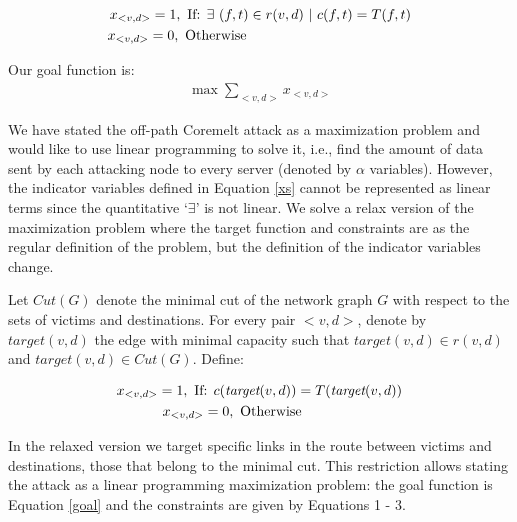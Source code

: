 \documentclass[conference]{IEEEtran}
\begin{document}
\begin{eqnarray} \label{xs}
x_{<v,d>} = 1, \text{ If: } \exists\text{ }(f,t)\in r(v,d)\text{ }|\text{ }c(f,t) = T(f,t) \nonumber\\
x_{<v,d>} = 0, \text{ Otherwise\hspace{118pt}}
\end{eqnarray}

Our goal function is:
\begin{eqnarray} \label{goal}
\max \sum_{<v,d>} x_{<v,d>}
\end{eqnarray}

We have stated the off-path Coremelt attack as a maximization problem and would like to use linear programming to solve it, i.e., find the amount of data sent by each attacking node to every server (denoted by $\alpha$ variables). However, the indicator variables defined in Equation \ref{xs} cannot be represented as linear terms since the quantitative `$\exists$' is not linear. We solve a relax version of the maximization problem where the target function and constraints are as the regular definition of the problem, but the definition of the indicator variables change. 

Let $\textit{Cut}(G)$ denote the minimal cut of the network graph $G$ with respect to the sets of victims and destinations. For every pair $<v,d>$, denote by $\textit{target}(v,d)$ the edge with minimal capacity such that $\textit{target}(v,d) \in r(v,d)$ and $\textit{target}(v,d) \in \textit{Cut}(G)$. Define:

\begin{eqnarray}
x_{<v,d>} = 1, \text{ If: } c(\textit{target}(v,d)) = T(\textit{target}(v,d)) \nonumber\\
x_{<v,d>} = 0, \text{ Otherwise\hspace{72pt}}
\end{eqnarray}

In the relaxed version we target specific links in the route between victims and destinations, those that belong to the minimal cut. This restriction allows stating the attack as a linear programming maximization problem: the goal function is Equation \ref{goal} and the constraints are given by Equations 1 - 3.
\end{document}
